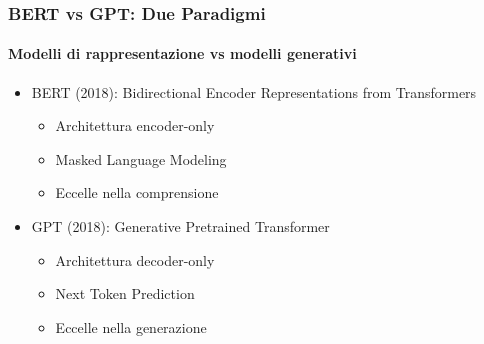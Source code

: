 %
\begin{frame}[t,fragile] \frametitle{BERT vs GPT: Due Paradigmi}
	{\scriptsize
		\onslide<1->
            \framesubtitle{Modelli di rappresentazione vs modelli generativi}
            \vspace*{-10pt}
	    	\begin{minipage}[t]{\textwidth}
				\begin{minipage}[t]{0.6\textwidth}
	    			\begin{itemize}[leftmargin=10pt,align=right]
						\onslide<2->\item[\alert{\faHandORight}] \alert{BERT (2018):} Bidirectional Encoder Representations from Transformers
						\begin{itemize}[leftmargin=10pt,align=right]
							\item[\alert{\faHandORight}] Architettura encoder-only
							\item[\alert{\faHandORight}] Masked Language Modeling
							\item[\alert{\faHandORight}] Eccelle nella comprensione
						\end{itemize}
						\item[\alert{\faHandORight}] \alert{GPT (2018):} Generative Pretrained Transformer
						\begin{itemize}[leftmargin=10pt,align=right]
							\item[\alert{\faHandORight}] Architettura decoder-only
							\item[\alert{\faHandORight}] Next Token Prediction
							\item[\alert{\faHandORight}] Eccelle nella generazione
						\end{itemize}
					\end{itemize}
            	\end{minipage}
            	\begin{minipage}[t]{0.4\textwidth}
            	\end{minipage}
	    	\end{minipage}
	}
\end{frame}
%
